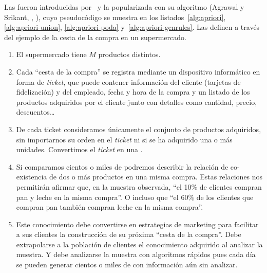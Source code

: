 

Las \ARs fueron introducidas por~\citet{AgrawalImielinskiSwami_MiningAssociationRulesBetweenSetsOfItemsInLargeDB_1993} y la \arm popularizada con su algoritmo \apriori (Agrawal y Srikant, \cite*{AgrawalSrikant_FastAlgorithmsForMiningAssociationRules_1994}, \cite*{AgrawalSrikant-FastAlgorithmsForMiningAssociationRules-LARGO-1994}), cuyo pseudocódigo se muestra en los listados~\ref{alg:apriori}, \ref{alg:apriori-union}, \ref{alg:apriori-poda} y~\ref{alg:apriori-genrules}. Las definen a través del ejemplo de la cesta de la compra en un supermercado.
\begin{enumerate}
  \item El supermercado tiene $M$ productos distintos.
  \item Cada "`cesta de la compra"' se registra mediante un dispositivo informático en forma de \emph{ticket}, que puede contener información del cliente (tarjetas de fidelización) y del empleado, fecha y hora de la compra y un listado de los productos adquiridos por el cliente junto con detalles como cantidad, precio, descuentos\ldots
  \item De cada ticket consideramos únicamente el conjunto de productos adquiridos, sin importarnos su orden en el \emph{ticket} ni si se ha adquirido una o más unidades. Convertimos el \emph{ticket} en una \transaccion.
  \item Si comparamos cientos o miles de \transacciones podremos describir la relación de co-existencia de dos o más productos en una misma compra. Estas relaciones nos permitirán afirmar que, en la muestra observada, "`el 10\% de clientes compran pan y leche en la misma compra"'. O incluso que "`el 60\% de los clientes que compran pan también compran leche en la misma compra"'.
  \item Este conocimiento debe convertirse en estrategias de marketing para facilitar a sus clientes la construcción de su próxima "`cesta de la compra"'. Debe extrapolarse a la población de clientes el conocimiento adquirido al analizar la muestra. Y debe analizarse la muestra con algoritmos rápidos pues cada día se pueden generar cientos o miles de \transacciones con información aún sin analizar.
\end{enumerate}

